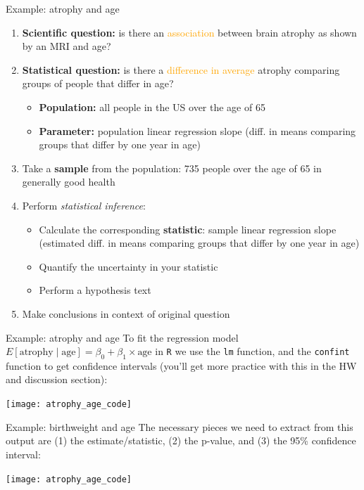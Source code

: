 \documentclass[10pt,t]{beamer}
\begin{document}
\begin{frame}{Example: atrophy and age}
\begin{enumerate}
	\item \textbf{Scientific question:} is there an \textcolor{orange}{association} between brain atrophy as shown by an MRI and age?
	\item \textbf{Statistical question:} is there a \textcolor{orange}{difference in average} atrophy comparing groups of people that differ in age? \pause
	\begin{itemize}
		\item \textbf{Population:} all people in the US over the age of 65
		\item \textbf{Parameter:} population linear regression slope (diff. in means comparing groups that differ by one year in age) \pause
	\end{itemize}
	\item Take a \textbf{sample} from the population: 735 people over the age of 65 in generally good health \pause
	\item Perform \textit{statistical inference}:
	\begin{itemize}
		\item Calculate the corresponding \textbf{statistic}: sample linear regression slope (estimated diff. in means comparing groups that differ by one year in age)\pause
		\item Quantify the uncertainty in your statistic
		\item Perform a hypothesis text
	\end{itemize} \pause
	\item Make conclusions in context of original question
\end{enumerate}
\end{frame}

\begin{frame}{Example: atrophy and age}
To fit the regression model $E[\text{atrophy} \mid \text{age}] = \beta_0 + \beta_1 \times \text{age}$ in \texttt{R} we use the \texttt{lm} function, and the \texttt{confint} function to get confidence intervals (you'll get more practice with this in the HW and discussion section):

\vspace{0.15cm}

\centering \texttt{[image: atrophy\_age\_code]}

\end{frame}

\begin{frame}{Example: birthweight and age}
The necessary pieces we need to extract from this output are (1) the estimate/statistic, (2) the p-value, and (3) the 95\% confidence interval:

\vspace{0.15cm}

\centering \texttt{[image: atrophy\_age\_code]}

\end{frame}
\end{document}
